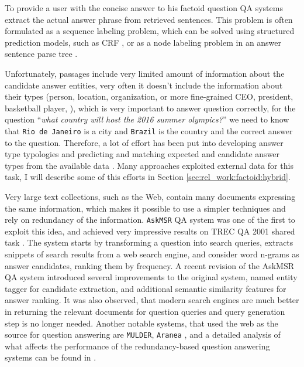 To provide a user with the concise answer to his factoid question QA systems extract the actual answer phrase from retrieved sentences.
This problem is often formulated as a sequence labeling problem, which can be solved using structured prediction models, such as CRF \cite{yao2013answer}, or as a node labeling problem in an answer sentence parse tree \cite{malon2013answer}.

Unfortunately, passages include very limited amount of information about the candidate answer entities, \ie very often it doesn't include the information about their types (person, location, organization, or more fine-grained CEO, president, basketball player, \etc), which is very important to answer question correctly, \eg for the question ``\textit{what country will host the 2016 summer olympics?}'' we need to know that \texttt{Rio de Janeiro} is a city and \texttt{Brazil} is the country and the correct answer to the question.
Therefore, a lot of effort has been put into developing answer type typologies \cite{hovy2000question,Hovy:2002:QTS:1289189.1289206} and predicting and matching expected and candidate answer types from the available data \cite{LiRoth02,li2006learning, prager2006question}.
Many approaches exploited external data for this task, I will describe some of this efforts in Section \ref{sec:rel_work:factoid:hybrid}.

Very large text collections, such as the Web, contain many documents expressing the same information, which makes it possible to use a simpler techniques and rely on redundancy of the information.
\texttt{AskMSR} QA system was one of the first to exploit this idea, and achieved very impressive results on TREC QA 2001 shared task \cite{brill2002analysis}.
The system starts by transforming a question into search queries, extracts snippets of search results from a web search engine, and consider word n-grams as answer candidates, ranking them by frequency.
A recent revision of the AskMSR QA system \cite{tsai2015web} introduced several improvements to the original system, \ie named entity tagger for candidate extraction, and additional semantic similarity features for answer ranking.
It was also observed, that modern search engines are much better in returning the relevant documents for question queries and query generation step is no longer needed.
Another notable systems, that used the web as the source for question answering are \texttt{MULDER}\cite{kwok2001scaling}, \texttt{Aranea} \cite{lin2003question}, and a detailed analysis of what affects the performance of the redundancy-based question answering systems can be found in \cite{lin2007exploration}.

